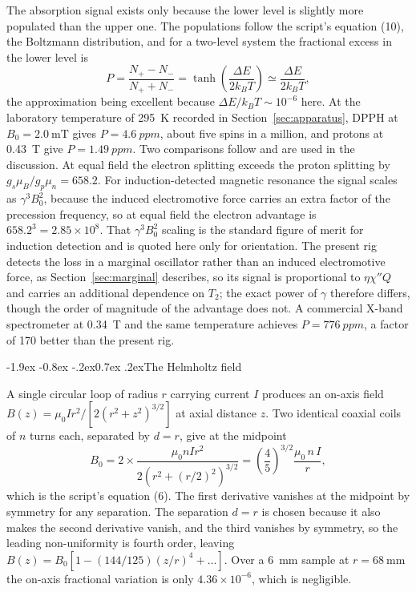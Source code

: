 \documentclass[11pt,a4paper]{article}
\makeatletter
\renewcommand\subsection{\@startsection{subsection}{2}{\z@}%
  {-1.9ex \@plus -0.8ex \@minus -.2ex}{0.7ex \@plus .2ex}{\normalfont\normalsize\bfseries}}
\makeatother
\begin{document}
The absorption signal exists only because the lower level is slightly more populated than the
upper one. The populations follow the script's equation (10), the Boltzmann distribution, and for
a two-level system the fractional excess in the lower level is
\begin{equation}
P = \frac{N_+ - N_-}{N_+ + N_-} = \tanh\!\left(\frac{\Delta E}{2k_B T}\right)
\simeq \frac{\Delta E}{2k_B T} ,
\end{equation}
the approximation being excellent because $\Delta E/k_B T \sim 10^{-6}$ here. At the laboratory
temperature of \SI{295}{\kelvin} recorded in Section~\ref{sec:apparatus}, DPPH at
$B_0 = \SI{2.0}{\milli\tesla}$ gives $P = \SI{4.6}{ppm}$, about five spins in a
million, and protons at \SI{0.43}{\tesla} give $P = \SI{1.49}{ppm}$.
Two comparisons follow and are used in the discussion. At equal field the
electron splitting exceeds the proton splitting by $g_s\mu_B/g_p\mu_n = 658.2$. For
induction-detected magnetic resonance the signal scales as $\gamma^{3}B_0^{2}$, because the
induced electromotive force carries an extra factor of the precession frequency, so at equal
field the electron advantage is $658.2^{3} = 2.85\times10^{8}$. That $\gamma^{3}B_0^{2}$ scaling
is the standard figure of merit for induction detection and is quoted here only for orientation.
The present rig detects the loss in a marginal oscillator rather than an induced electromotive
force, as Section~\ref{sec:marginal} describes, so its signal is proportional to
$\eta\chi''Q$ and carries an additional dependence on $T_2$; the exact power of $\gamma$ therefore
differs, though the order of magnitude of the advantage does not. A commercial X-band
spectrometer at
\SI{0.34}{\tesla} and the same temperature achieves $P = \SI{776}{ppm}$, a factor of 170 better
than the present rig.

\subsection{The Helmholtz field}

A single circular loop of radius $r$ carrying current $I$ produces an on-axis field
$B(z) = \mu_0 I r^{2}/[2(r^{2}+z^{2})^{3/2}]$ at axial distance $z$. Two identical coaxial coils of
$n$ turns each, separated by $d = r$, give at the midpoint
\begin{equation}
B_0 = 2\times\frac{\mu_0 n I r^{2}}{2\left(r^{2} + (r/2)^{2}\right)^{3/2}}
= \left(\frac{4}{5}\right)^{3/2}\frac{\mu_0\,n\,I}{r} ,
\label{eq:helm}
\end{equation}
which is the script's equation (6). The first derivative vanishes at the midpoint by symmetry for
any separation. The separation $d = r$ is chosen because it also makes the second derivative
vanish, and the third vanishes by symmetry, so the leading non-uniformity is fourth order,
leaving $B(z) = B_0[1 - (144/125)(z/r)^{4} + \ldots]$.
Over a \SI{6}{\milli\metre} sample at $r = \SI{68}{\milli\metre}$ the on-axis fractional variation
is only $4.36\times10^{-6}$, which is negligible.
\end{document}
